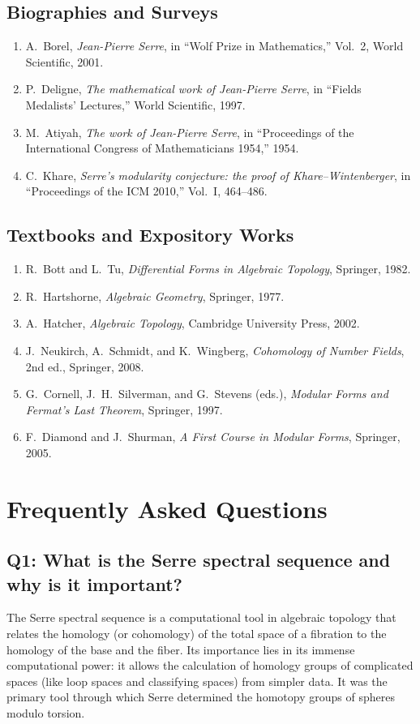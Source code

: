 \subsection*{Biographies and Surveys}
\begin{enumerate}
    \item A.\ Borel, \textit{Jean-Pierre Serre}, in ``Wolf Prize in Mathematics,'' Vol.\ 2, World Scientific, 2001.
    \item P.\ Deligne, \textit{The mathematical work of Jean-Pierre Serre}, in ``Fields Medalists' Lectures,'' World Scientific, 1997.
    \item M.\ Atiyah, \textit{The work of Jean-Pierre Serre}, in ``Proceedings of the International Congress of Mathematicians 1954,'' 1954.
    \item C.\ Khare, \textit{Serre's modularity conjecture: the proof of Khare--Wintenberger}, in ``Proceedings of the ICM 2010,'' Vol.\ I, 464--486.
\end{enumerate}

\subsection*{Textbooks and Expository Works}
\begin{enumerate}
    \item R.\ Bott and L.\ Tu, \textit{Differential Forms in Algebraic Topology}, Springer, 1982.
    \item R.\ Hartshorne, \textit{Algebraic Geometry}, Springer, 1977.
    \item A.\ Hatcher, \textit{Algebraic Topology}, Cambridge University Press, 2002.
    \item J.\ Neukirch, A.\ Schmidt, and K.\ Wingberg, \textit{Cohomology of Number Fields}, 2nd ed., Springer, 2008.
    \item G.\ Cornell, J.\ H.\ Silverman, and G.\ Stevens (eds.), \textit{Modular Forms and Fermat's Last Theorem}, Springer, 1997.
    \item F.\ Diamond and J.\ Shurman, \textit{A First Course in Modular Forms}, Springer, 2005.
\end{enumerate}

\section*{Frequently Asked Questions}

\subsection*{Q1: What is the Serre spectral sequence and why is it important?}
The Serre spectral sequence is a computational tool in algebraic topology that relates the homology (or cohomology) of the total space of a fibration to the homology of the base and the fiber. Its importance lies in its immense computational power: it allows the calculation of homology groups of complicated spaces (like loop spaces and classifying spaces) from simpler data. It was the primary tool through which Serre determined the homotopy groups of spheres modulo torsion.

